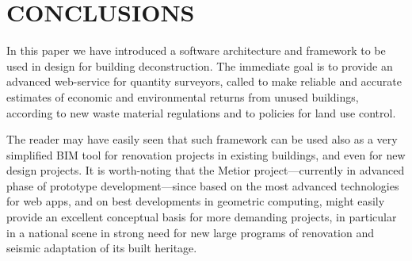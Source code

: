 \section{\uppercase{Conclusions}}
\label{sec:conclusion}

\noindent
In this paper we have introduced a software architecture and framework to be used in  design for building deconstruction. The immediate goal is to provide an advanced web-service for quantity surveyors, called  to make reliable and accurate estimates of economic and environmental returns from unused buildings, according to new waste material regulations and to policies for land use control.

The reader may have easily seen that such framework can be used also as a very simplified BIM tool for renovation projects in existing buildings, and even for new design projects. It is worth-noting that the Metior project---currently in advanced phase of prototype development---since based on the most advanced technologies for web apps, and on best developments in geometric computing, might easily provide an excellent conceptual basis for more demanding projects, in particular in a national scene in strong need for new large programs of renovation and seismic adaptation of its built heritage.
